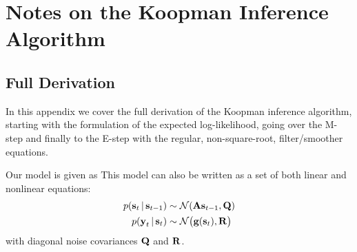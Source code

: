 \chapter{Notes on the Koopman Inference Algorithm}



\section{Full Derivation}
	\label{app:fullNgkDerivation}

	In this appendix we cover the full derivation of the Koopman inference algorithm, starting with the formulation of the expected log-likelihood, going over the M-step and finally to the E-step with the regular, non-square-root, filter/smoother equations.

	Our model is given as
	This model can also be written as a set of both linear and nonlinear equations:
	\begin{align*}
		p(\boldsymbol{\mathrm{s}}_t \,\vert\, \boldsymbol{\mathrm{s}}_{t - 1}) &\sim \mathcal{N}(\boldsymbol{\mathrm{A}} \boldsymbol{\mathrm{s}}_{t - 1}, \boldsymbol{\mathrm{Q}}) \\
		p(\boldsymbol{\mathrm{y}}_t \,\vert\, \boldsymbol{\mathrm{s}}_t)       &\sim \mathcal{N}\big(\boldsymbol{\mathrm{g}}(\boldsymbol{\mathrm{s}}_t), \boldsymbol{\mathrm{R}}\big)
	\end{align*}
	with diagonal noise covariances \(\boldsymbol{\mathrm{Q}}\) and \(\boldsymbol{\mathrm{R}}\).

